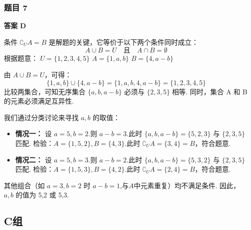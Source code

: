 \subsubsection*{题目 7}
\begin{solution}
	\textbf{答案 D}
	
	条件 $\complement_U A = B$ 是解题的关键，它等价于以下两个条件同时成立：
	\[ A \cup B = U \quad \text{且} \quad A \cap B = \emptyset \]
	根据题意：
	$U=\{1,2,3,4,5\}$
	$A=\{1,a,b\}$
	$B=\{4, a-b\}$
	
	由 $A \cup B = U$，可得：
	\[ \{1,a,b\} \cup \{4, a-b\} = \{1, a, b, 4, a-b\} = \{1,2,3,4,5\} \]
	比较两集合，可知无序集合 $\{a, b, a-b\}$ 必须与 $\{2,3,5\}$ 相等.
	同时，集合 A 和 B 的元素必须满足互异性.
	
	我们通过分类讨论来寻找 $a,b$ 的取值：
	\begin{itemize}
		\item \textbf{情况一：} 设 $a=5, b=2$.则 $a-b = 3$.此时 $\{a,b,a-b\} = \{5,2,3\}$ 与 $\{2,3,5\}$ 匹配.
		检验：$A=\{1,5,2\}, B=\{4,3\}$.此时 $\complement_U A = \{3,4\}=B$，符合题意.
		\item \textbf{情况二：} 设 $a=5, b=3$.则 $a-b = 2$.此时 $\{a,b,a-b\} = \{5,3,2\}$ 与 $\{2,3,5\}$ 匹配.
		检验：$A=\{1,5,3\}, B=\{4,2\}$.此时 $\complement_U A = \{2,4\}=B$，符合题意.
	\end{itemize}
	其他组合（如 $a=3,b=2$ 时 $a-b=1$,与$A$中元素重复）均不满足条件.
	因此，$a,b$ 的值为 5,2 或 5,3.
\end{solution}

\subsection*{C组}

